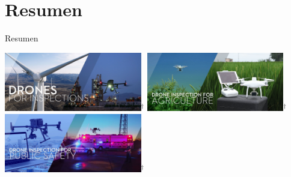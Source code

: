 \documentclass[
	12pt, %
	aspectratio=169, %
]{beamer}
\begin{document}


\section{Resumen}

\begin{frame}{Resumen}%

  \bigskip %
  \centering
  \includegraphics[width=0.45\textwidth,height=0.35\textheight]{DJI_B1}$^\dag$
  \hfil
  \includegraphics[width=0.45\textwidth,height=0.35\textheight]{DJI_B2}$^\dag$
  \vspace{2pt}
  \includegraphics[width=0.45\textwidth,height=0.35\textheight]{DJI_B5}$^\dag$ 

\end{frame}
\end{document}
